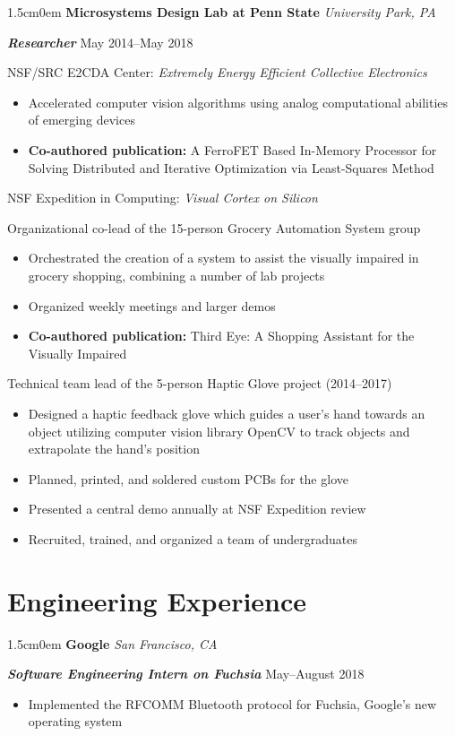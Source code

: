 \documentclass[letterpaper]{article}
\newcommand{\primaryindent}{1.5cm} %
\newcommand{\resumesubsection}[1]{
	\vspace{1.5ex}
	\noindent \large \textsf{{#1}}\par
	\vspace{.5ex}
	\normalsize
}
\newenvironment{indented}{\begin{adjustwidth}{\primaryindent}{0em}}{\end{adjustwidth}}
\newenvironment{resumelist}{\begin{itemize}[topsep=0pt,noitemsep,itemindent=-15pt,leftmargin=30pt]}{\end{itemize}}
\newcommand{\generalentry}[5]{
	\begin{indented}
		\Large \textsf{\textbf{#1}} \hfill	%
			\hfill\normalsize\textit{#2} \par  			%
		\noindent \large \textsf{\textbf{\textit{#3}}} 	%
			\hfill \normalsize #4\par 					%
		\normalsize \normalfont #5 \par					%
		\normalsize \normalfont
	\end{indented}
	}
\begin{document}
\generalentry{Microsystems Design Lab at Penn State}{University Park, PA}{Researcher}{May 2014--May 2018}{		
	
	\resumesubsection{NSF/SRC E2CDA Center: \textit{Extremely Energy Efficient Collective Electronics}}
	\begin{resumelist}
		\item Accelerated computer vision algorithms using analog computational abilities of emerging devices
		\item\textbf{Co-authored publication:} A FerroFET Based In-Memory Processor for Solving Distributed and Iterative Optimization via Least-Squares Method \cite{ferrofet}
	\end{resumelist}
	
	\resumesubsection{NSF Expedition in Computing: \textit{Visual Cortex on Silicon}}
	
	Organizational co-lead of the 15-person Grocery Automation System group
	\begin{resumelist}
		\item Orchestrated the creation of a system to assist the visually impaired in grocery shopping, combining a number of lab projects
		\item Organized weekly meetings and larger demos
		\item\textbf{Co-authored publication:} Third Eye: A Shopping Assistant for the Visually Impaired \cite{7842859}
	\end{resumelist}
	
	\vspace{1mm}
	
	Technical team lead of the 5-person Haptic Glove project (2014--2017)
	\begin{resumelist}
		\item Designed a haptic feedback glove which guides a user's hand towards an object utilizing computer vision library OpenCV to track objects and extrapolate the hand's position
		\item Planned, printed, and soldered custom PCBs for the glove	
		\item Presented a central demo annually at NSF Expedition review
		\item Recruited, trained, and organized a team of undergraduates
	\end{resumelist}


}


\section*{Engineering Experience}
\generalentry{Google}{San Francisco, CA}{Software Engineering Intern on Fuchsia}{May--August 2018}{
	\begin{resumelist}
		\item Implemented the RFCOMM Bluetooth protocol for Fuchsia, Google's new operating system
	\end{resumelist}
}
\vspace{3mm} %
\end{document}
